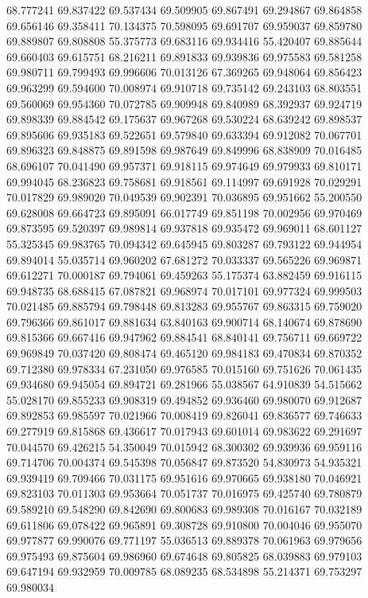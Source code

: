 68.777241
69.837422
69.537434
69.509905
69.867491
69.294867
69.864858
69.656146
69.358411
70.134375
70.598095
69.691707
69.959037
69.859780
69.889807
69.808808
55.375773
69.683116
69.934416
55.420407
69.885644
69.660403
69.615751
68.216211
69.891833
69.939836
69.975583
69.581258
69.980711
69.799493
69.996606
70.013126
67.369265
69.948064
69.856423
69.963299
69.594600
70.008974
69.910718
69.735142
69.243103
68.803551
69.560069
69.954360
70.072785
69.909948
69.840989
68.392937
69.924719
69.898339
69.884542
69.175637
69.967268
69.530224
68.639242
69.898537
69.895606
69.935183
69.522651
69.579840
69.633394
69.912082
70.067701
69.896323
69.848875
69.891598
69.987649
69.849996
68.838909
70.016485
68.696107
70.041490
69.957371
69.918115
69.974649
69.979933
69.810171
69.994045
68.236823
69.758681
69.918561
69.114997
69.691928
70.029291
70.017829
69.989020
70.049539
69.902391
70.036895
69.951662
55.200550
69.628008
69.664723
69.895091
66.017749
69.851198
70.002956
69.970469
69.873595
69.520397
69.989814
69.937818
69.935472
69.969011
68.601127
55.325345
69.983765
70.094342
69.645945
69.803287
69.793122
69.944954
69.894014
55.035714
69.960202
67.681272
70.033337
69.565226
69.969871
69.612271
70.000187
69.794061
69.459263
55.175374
63.882459
69.916115
69.948735
68.688415
67.087821
69.968974
70.017101
69.977324
69.999503
70.021485
69.885794
69.798448
69.813283
69.955767
69.863315
69.759020
69.796366
69.861017
69.881634
63.840163
69.900714
68.140674
69.878690
69.815366
69.667416
69.947962
69.884541
68.840141
69.756711
69.669722
69.969849
70.037420
69.808474
69.465120
69.984183
69.470834
69.870352
69.712380
69.978334
67.231050
69.976585
70.015160
69.751626
70.061435
69.934680
69.945054
69.894721
69.281966
55.038567
64.910839
54.515662
55.028170
69.855233
69.908319
69.494852
69.936460
69.980070
69.912687
69.892853
69.985597
70.021966
70.008419
69.826041
69.836577
69.746633
69.277919
69.815868
69.436617
70.017943
69.601014
69.983622
69.291697
70.044570
69.426215
54.350049
70.015942
68.300302
69.939936
69.959116
69.714706
70.004374
69.545398
70.056847
69.873520
54.830973
54.935321
69.939419
69.709466
70.031175
69.951616
69.970665
69.938180
70.046921
69.823103
70.011303
69.953664
70.051737
70.016975
69.425740
69.780879
69.589210
69.548290
69.842690
69.800683
69.989308
70.016167
70.032189
69.611806
69.078422
69.965891
69.308728
69.910800
70.004046
69.955070
69.977877
69.990076
69.771197
55.036513
69.889378
70.061963
69.979656
69.975493
69.875604
69.986960
69.674648
69.805825
68.039883
69.979103
69.647194
69.932959
70.009785
68.089235
68.534898
55.214371
69.753297
69.980034
